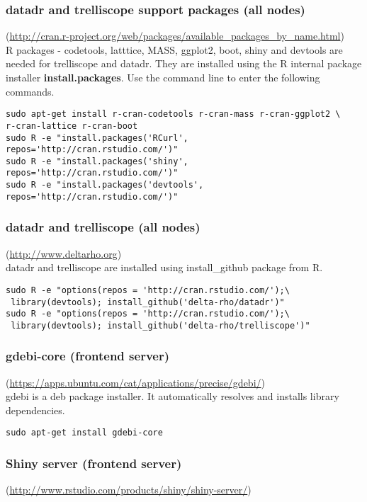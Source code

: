 \subsubsection{datadr and trelliscope support packages (all nodes)}(\url{http://cran.r-project.org/web/packages/available\_packages\_by\_name.html})\\
R packages - codetools, latttice, MASS, ggplot2, boot, shiny and devtools are needed for trelliscope and datadr. They are installed using the R internal package installer \textbf{install.packages}. Use the command line to enter the following commands.
\begin{verbatim}
sudo apt-get install r-cran-codetools r-cran-mass r-cran-ggplot2 \
r-cran-lattice r-cran-boot
sudo R -e "install.packages('RCurl', repos='http://cran.rstudio.com/')"
sudo R -e "install.packages('shiny', repos='http://cran.rstudio.com/')"
sudo R -e "install.packages('devtools', repos='http://cran.rstudio.com/')"
\end{verbatim}

\subsubsection{datadr and trelliscope (all nodes)}(\url{http://www.deltarho.org})\\
datadr and trelliscope are installed using install\_github package from R.
\begin{verbatim}
sudo R -e "options(repos = 'http://cran.rstudio.com/');\
 library(devtools); install_github('delta-rho/datadr')"
sudo R -e "options(repos = 'http://cran.rstudio.com/');\
 library(devtools); install_github('delta-rho/trelliscope')"
\end{verbatim}

\subsubsection{gdebi-core (frontend server)}(\url{https://apps.ubuntu.com/cat/applications/precise/gdebi/})\\
gdebi is a deb package installer. It automatically resolves and installs library dependencies.
\begin{verbatim}
sudo apt-get install gdebi-core
\end{verbatim}

\subsubsection{Shiny server (frontend server)}(\url{http://www.rstudio.com/products/shiny/shiny-server/})\\

